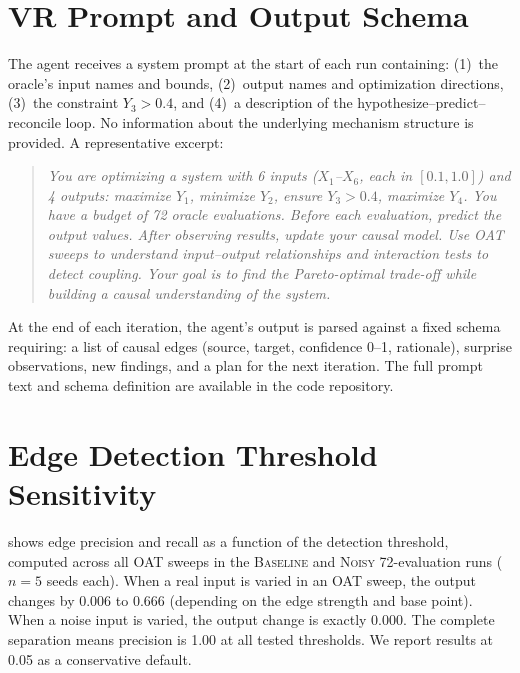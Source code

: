 \documentclass[11pt,letterpaper]{article}
\newcommand{\oracle}[1]{\textsc{#1}}
\newcommand{\baseline}{\oracle{Baseline}}
\newcommand{\noisy}{\oracle{Noisy}}
\begin{document}
\section{VR Prompt and Output Schema}
\label{app:prompt}

The agent receives a system prompt at the start of each run containing:
(1)~the oracle's input names and bounds, (2)~output names and
optimization directions, (3)~the constraint $Y_3 > 0.4$, and (4)~a
description of the hypothesize--predict--reconcile loop. No information
about the underlying mechanism structure is provided. A representative
excerpt:

\begin{quote}\small
\emph{You are optimizing a system with 6 inputs ($X_1$--$X_6$, each in
$[0.1, 1.0]$) and 4 outputs: maximize $Y_1$, minimize $Y_2$, ensure
$Y_3 > 0.4$, maximize $Y_4$. You have a budget of 72 oracle
evaluations. Before each evaluation, predict the output values. After
observing results, update your causal model. Use OAT sweeps to
understand input--output relationships and interaction tests to detect
coupling. Your goal is to find the Pareto-optimal trade-off while
building a causal understanding of the system.}
\end{quote}

At the end of each iteration, the agent's output is parsed against a
fixed schema requiring: a list of causal edges (source, target,
confidence 0--1, rationale), surprise observations, new findings, and a
plan for the next iteration. The full prompt text and schema definition
are available in the code repository.

\section{Edge Detection Threshold Sensitivity}
\label{app:threshold_sensitivity}

 shows edge precision and recall as a function of the
detection threshold, computed across all OAT sweeps in the \baseline{}
and \noisy{} 72-evaluation runs ($n = 5$ seeds each). When a real input
is varied in an OAT sweep, the output changes by 0.006 to 0.666
(depending on the edge strength and base point). When a noise input is
varied, the output change is exactly 0.000. The complete separation means precision is 1.00 at all
tested thresholds. We report results at 0.05 as a conservative default.
\end{document}
